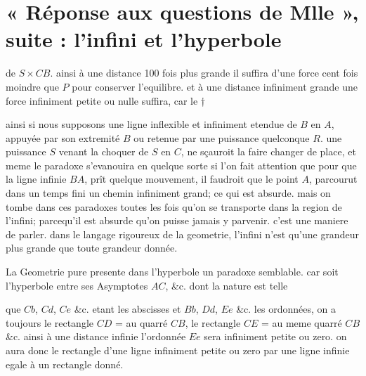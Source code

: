 \documentclass[11pt,a4paper]{article}
\begin{document}
\section{« Réponse aux questions de Mlle », suite : l'infini et l'hyperbole}

de $S \times CB$. ainsi à une distance 100 fois plus grande il suffira d'une
force cent fois moindre que $P$ pour conserver l'equilibre. et à une distance
infiniment grande une force infiniment petite ou nulle suffira, car le
† \struck{\ill{}}



ainsi si nous supposons une ligne inflexible et infiniment etendue de $B$ en
$A$, appuyée par son extremité $B$ ou retenue par une puissance quelconque
$R$. une puissance $S$ venant la choquer de $S$ en $C$, ne sçauroit la faire
changer de place, et meme le paradoxe s'evanouira en quelque sorte si l'on
fait attention que pour que la ligne infinie $BA$, prît quelque mouvement, il
faudroit que le point $A$,  parcourut dans un temps fini un
chemin infiniment grand; ce qui est absurde. mais on tombe dans ces paradoxes
toutes les fois qu'on se transporte dans la region de l'infini; parcequ'il est
absurde qu'on puisse jamais y parvenir. c'est une maniere de parler. dans le
langage rigoureux de la geometrie, l'infini n'est qu'une grandeur plus grande
que toute grandeur donnée.


La Geometrie pure presente dans l'hyperbole un paradoxe semblable. car soit
l'hyperbole entre ses Asymptotes $AC$,  \&c. dont la nature
est telle

que $Cb$, $Cd$, $Ce$ \&c. etant les abscisses et $Bb$, $Dd$, $Ee$ \&c. les
ordonnées, on a toujours le rectangle $CD$ = au quarré $CB$,  le
rectangle $CE$ = au meme quarré $CB$ \&c. ainsi à une distance infinie
l'ordonnée $Ee$ sera infiniment petite ou zero. on aura donc le rectangle
d'une ligne infiniment petite ou zero par une ligne infinie egale à un
rectangle donné.
\end{document}
